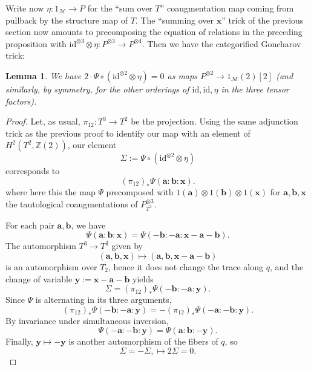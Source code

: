 \documentclass[a4paper,reqno,11pt]{amsart}
\theoremstyle{plain}
\newtheorem{lemma}[theorem]{Lemma}
\theoremstyle{definition}
\theoremstyle{remark}
\newcommand{\Z}{\mathbb{Z}}
\begin{document}
Write now $\eta:1_{\mathcal{M}}\to P$ for the ``sum over $T$'' coaugmentation map coming from pullback by the structure map of $T$. The ``summing over $\mathbf{x}$'' trick of the previous section now amounts to precomposing the equation of relations in the preceding proposition with $\mathrm{id}^{\otimes 3} \otimes \eta: P^{\otimes 3} \to P^{\otimes 4}$. Then we have the categorified Goncharov trick:

\begin{lemma}
    We have $2 \cdot \Psi \circ (\mathrm{id}^{\otimes 2} \otimes \eta)=0$ as maps $P^{\otimes 2} \to 1_{\mathcal{M}}(2)[2]$ (and similarly, by symmetry, for the other orderings of $\mathrm{id},\mathrm{id},\eta$ in the three tensor factors).
\end{lemma}
\begin{proof}
    Let, as usual, $\pi_{12}:T^3\longrightarrow T^2$ be the projection. Using the same adjunction trick as the previous proof to identify our map with an element of $H^2(T^2, \Z(2))$, our element 
    \[
        \Sigma:=\Psi\circ(\mathrm{id}^{\otimes2}\otimes\eta)
    \]
    corresponds to
    \[
        (\pi_{12})_*\Psi(\mathbf a:\mathbf b:\mathbf x).
    \]
    where here this the map $\Psi$ precomposed with $1(\mathbf{a})\otimes 1(\mathbf{b}) \otimes 1(\mathbf{x})$ for $\mathbf{a},\mathbf{b},\mathbf{x}$ the tautological coaugmentations of $P^{\otimes 3}_{T^3}$.

    For each pair $\mathbf a,\mathbf b$, we have
    \[
    \Psi(\mathbf a:\mathbf b:\mathbf x)
    =
    \Psi(-\mathbf b:-\mathbf a:\mathbf x-\mathbf a-\mathbf b).
    \]
    The automorphism $T^3\to T^3$ given by
    \[
    (\mathbf a,\mathbf b,\mathbf x)
    \mapsto
    (\mathbf a,\mathbf b,\mathbf x-\mathbf a-\mathbf b)
    \]
    is an automorphism over $T_2$, hence it does not change the trace along
    $q$, and the change of variable $\mathbf y:=\mathbf x-\mathbf a-\mathbf b$ yields
    \[
    \Sigma
    =
    (\pi_{12})_*\Psi(-\mathbf b:-\mathbf a:\mathbf y).
    \]
    Since $\Psi$ is alternating in its three arguments,
    \[
    (\pi_{12})_*\Psi(-\mathbf b:-\mathbf a:\mathbf y)
    =
    -(\pi_{12})_*\Psi(-\mathbf a:-\mathbf b:\mathbf y).
    \]
    By invariance under simultaneous inversion,
    \[
    \Psi(-\mathbf a:-\mathbf b:\mathbf y)
    =
    \Psi(\mathbf a:\mathbf b:-\mathbf y).
    \]
    Finally, $\mathbf y\mapsto-\mathbf y$ is another automorphism of the fibers of $q$, so
    \[
    \Sigma
    =
    -\Sigma, \mapsto 2\Sigma =0.
    \]
\end{proof}
\end{document}
